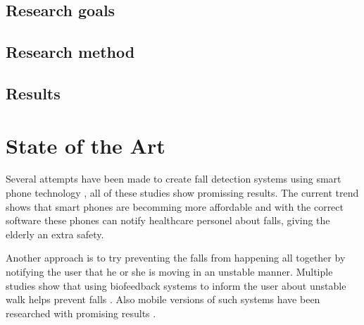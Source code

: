 \documentclass[11pt,twoside,a4paper]{report}
\begin{document}
\section{Research goals}

\section{Research method}

\section{Results}


\chapter{State of the Art}

Several attempts have been made to create fall detection systems using smart phone technology \cite{iFall, semiSupervisedFallDetection, mobilePhoneBasedFallDetection, detectionOfFalls}, all of these studies show promissing results. The current trend shows that smart phones are becomming more affordable \cite{find_some_data_here} and with the correct software these phones can notify healthcare personel about falls, giving the elderly an extra safety.

Another approach is to try preventing the falls from happening all together by notifying the user that he or she is moving in an unstable manner. Multiple studies show that using biofeedback systems to inform the user about unstable walk helps prevent falls \cite{multiModualBiofeedback, vibrotactileBiofeedback, vibrotactileTiltFeedback}. %
Also mobile versions of such systems have been researched with promising results \cite{fallPrevention}.
\end{document}
